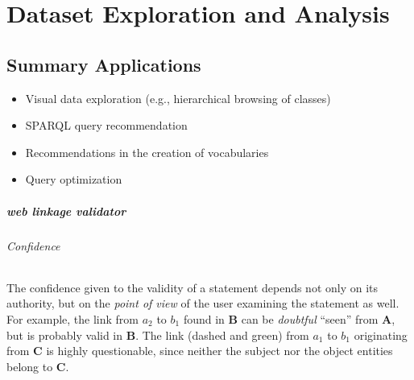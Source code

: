 \chapter{Dataset Exploration and Analysis}
\label{chap:system}

\section{Summary Applications}
\label{sec:apps}

\begin{itemize}
\item Visual data exploration (e.g., hierarchical browsing of classes)
\item SPARQL query recommendation
\item Recommendations in the creation of vocabularies
\item Query optimization
\end{itemize}

\paragraph{web linkage validator}

\subparagraph{Confidence}

The confidence given to the validity of a statement depends not only on its authority, but on the \emph{point of view} of the user examining the statement as well. For example, the link from $a_2$ to $b_1$ found in \textbf{B} can be \emph{doubtful} ``seen'' from \textbf{A}, but is probably valid in \textbf{B}. The link (dashed and green) from $a_1$ to $b_1$ originating from \textbf{C} is highly questionable, since neither the subject nor the object entities belong to \textbf{C}.
